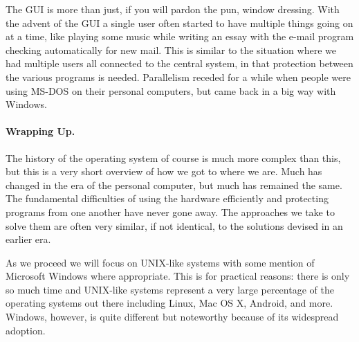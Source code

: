 The GUI is more than just, if you will pardon the pun, window dressing. With the advent of the GUI a single user often started to have multiple things going on at a time, like playing some music while writing an essay with the e-mail program checking automatically for new mail. This is similar to the situation where we had multiple users all connected to the central system, in that protection between the various programs is needed. Parallelism receded for a while when people were using MS-DOS on their personal computers, but came back in a big way with Windows.

\paragraph{Wrapping Up.}
The history of the operating system of course is much more complex than this, but this is a very short overview of how we got to where we are. Much has changed in the era of the personal computer, but much has remained the same. The fundamental difficulties of using the hardware efficiently and protecting programs from one another have never gone away. The approaches we take to solve them are often very similar, if not identical, to the solutions devised in an earlier era.

As we proceed we will focus on UNIX-like systems with some mention of Microsoft Windows where appropriate. This is for practical reasons: there is only so much time and UNIX-like systems represent a very large percentage of the operating systems out there including Linux, Mac OS X, Android, and more. Windows, however, is quite different but noteworthy because of its widespread adoption. 



